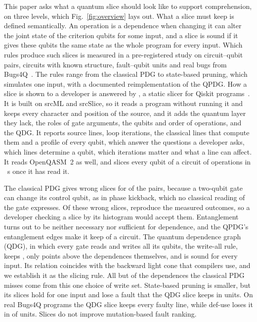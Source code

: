 This paper asks what a quantum slice should look like to support comprehension, on three levels, which
Fig.~\ref{fig:overview} lays out. What a
slice must keep is defined semantically. An operation is a dependence when changing it can alter the joint
state of the criterion qubits for some input, and a slice is sound if it gives these qubits the same state
as the whole program for every input. Which rules produce such slices is measured in a pre-registered study
on \numNPairs{} circuit--qubit pairs, \numFamCircuits{} circuits with known structure, \numRqThreeUnits{}
fault--qubit units and real bugs from Bugs4Q~\cite{zhao2023bugs4q}. The rules range from the classical PDG to state-based
pruning, which simulates one input, with a documented reimplementation of the QPDG. How a slice is shown to
a developer is answered by \tool{}, a static slicer for Qiskit programs~\cite{javadi2024qiskit}. It is
built on srcML and srcSlice, so it reads a program without running it and keeps every character and
position of the source, and it adds the quantum layer they lack, the roles of gate arguments, the qubits
and order of operations, and the QDG. It reports source lines, loop iterations, the classical lines that
compute them and a profile of every qubit, which answer the questions a developer asks, which lines determine a
qubit, which iterations matter and what a line can affect. It reads OpenQASM~2 as well, and slices every qubit of a
circuit of \numScaleQbMaxOps{} operations in \numScaleQbAllS{}~s once it has read it.

The classical PDG gives wrong slices for \numCpdgUnsoundPct{} of the pairs, because a two-qubit gate can
change its control qubit, as in phase kickback, which no classical reading of the gate expresses. Of these
wrong slices, \numFdCpdgZMatchPct{} reproduce the measured outcomes, so a developer checking a slice by its
histogram would accept them. Entanglement turns out to be neither necessary nor sufficient for dependence,
and the QPDG's entanglement edges make it keep \numRqOneYzSize{} of a circuit. The quantum dependence graph
(QDG), in which every gate reads and writes all its qubits, the write-all rule, keeps \numRqOneLcSize{}, only \numLcExcess{}
points above the dependences themselves, and is sound for every input. Its relation coincides with the backward light cone that compilers use, and we establish it as the slicing
rule. All but \numCpdgMissFeedback{} of the \numCpdgMissTotal{} dependences the classical PDG misses come from
this one choice of write set. State-based pruning is \numHTwoRelative{} smaller,
but its slices hold for one input and lose a fault that the QDG slice keeps in \numCQFour{} units. On real
Bugs4Q programs the QDG slice keeps every faulty line, while def-use loses it in \numLinesDuMissed{} of
\numLinesUnits{} units. Slices do not improve mutation-based fault ranking.

